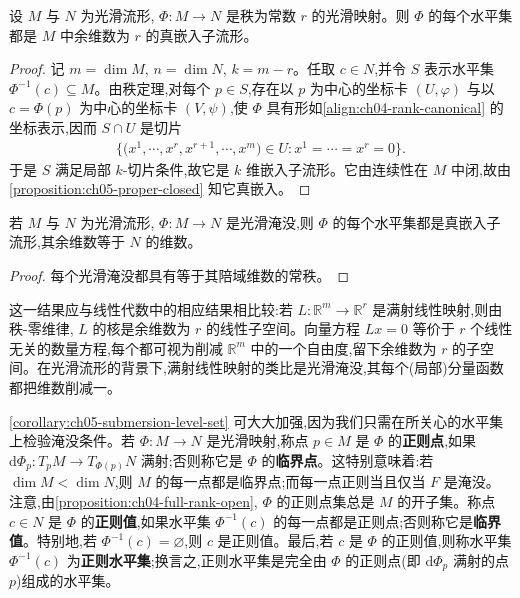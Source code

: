 \documentclass[../../main.tex]{subfiles}
\begin{document}
\begin{theorem}\label{theorem:ch05-constant-rank-level-set}
设 $M$ 与 $N$ 为光滑流形, $\Phi:M\to N$ 是秩为常数 $r$ 的光滑映射。则 $\Phi$ 的每个水平集都是 $M$ 中余维数为 $r$ 的真嵌入子流形。
\end{theorem}

\begin{proof}
记 $m=\dim M$, $n=\dim N$, $k=m-r$。任取 $c\in N$,并令 $S$ 表示水平集 $\Phi^{-1}(c)\subseteq M$。由秩定理,对每个 $p\in S$,存在以 $p$ 为中心的坐标卡 $(U,\varphi)$ 与以 $c=\Phi(p)$ 为中心的坐标卡 $(V,\psi)$,使 $\Phi$ 具有形如\eqref{align:ch04-rank-canonical} 的坐标表示,因而 $S\cap U$ 是切片
\begin{align*}
\bigl\{\bigl(x^1,\cdots ,x^r,x^{r+1},\cdots ,x^m\bigr)\in U:x^1=\cdots=x^r=0\bigr\}.
\end{align*}
于是 $S$ 满足局部 $k$-切片条件,故它是 $k$ 维嵌入子流形。它由连续性在 $M$ 中闭,故由\cref{proposition:ch05-proper-closed} 知它真嵌入。
\end{proof}

\begin{corollary}\label{corollary:ch05-submersion-level-set}
若 $M$ 与 $N$ 为光滑流形, $\Phi:M\to N$ 是光滑淹没,则 $\Phi$ 的每个水平集都是真嵌入子流形,其余维数等于 $N$ 的维数。
\end{corollary}

\begin{proof}
每个光滑淹没都具有等于其陪域维数的常秩。
\end{proof}

这一结果应与线性代数中的相应结果相比较:若 $L:\mathbb{R}^m\to\mathbb{R}^r$ 是满射线性映射,则由秩-零维律, $L$ 的核是余维数为 $r$ 的线性子空间。向量方程 $Lx=0$ 等价于 $r$ 个线性无关的数量方程,每个都可视为削减 $\mathbb{R}^m$ 中的一个自由度,留下余维数为 $r$ 的子空间。在光滑流形的背景下,满射线性映射的类比是光滑淹没,其每个(局部)分量函数都把维数削减一。

\cref{corollary:ch05-submersion-level-set} 可大大加强,因为我们只需在所关心的水平集上检验淹没条件。若 $\Phi:M\to N$ 是光滑映射,称点 $p\in M$ 是 $\Phi$ 的\textbf{正则点},如果 $\mathrm{d}\Phi_p:T_pM\to T_{\Phi(p)}N$ 满射;否则称它是 $\Phi$ 的\textbf{临界点}。这特别意味着:若 $\dim M<\dim N$,则 $M$ 的每一点都是临界点;而每一点正则当且仅当 $F$ 是淹没。注意,由\cref{proposition:ch04-full-rank-open}, $\Phi$ 的正则点集总是 $M$ 的开子集。称点 $c\in N$ 是 $\Phi$ 的\textbf{正则值},如果水平集 $\Phi^{-1}(c)$ 的每一点都是正则点;否则称它是\textbf{临界值}。特别地,若 $\Phi^{-1}(c)=\varnothing$,则 $c$ 是正则值。最后,若 $c$ 是 $\Phi$ 的正则值,则称水平集 $\Phi^{-1}(c)$ 为\textbf{正则水平集};换言之,正则水平集是完全由 $\Phi$ 的正则点(即 $\mathrm{d}\Phi_p$ 满射的点 $p$)组成的水平集。
\end{document}
